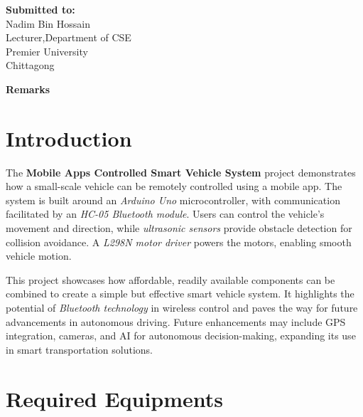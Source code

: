 \documentclass[12pt,a4paper]{report}
\begin{document}
\begin{titlepage}
    \begin{minipage}[t]{0.5\textwidth}
        \textbf{Submitted to:}
        \\Nadim Bin Hossain
        \\Lecturer,Department of CSE
        \\ Premier University
        \\ Chittagong
    \end{minipage}%
    \begin{minipage}[t]{0.6\textwidth}
        \raggedleft
        \textbf{Remarks}\\
        \vspace{0.5cm} 
    \end{minipage}

    \date{\today}
    \vfill
\end{titlepage}
\tableofcontents
\newpage


\chapter*{Introduction}

The \textbf{Mobile Apps Controlled Smart Vehicle System} project demonstrates how a small-scale vehicle can be remotely controlled using a mobile app. The system is built around an \textit{Arduino Uno} microcontroller, with communication facilitated by an \textit{HC-05 Bluetooth module}. Users can control the vehicle’s movement and direction, while \textit{ultrasonic sensors} provide obstacle detection for collision avoidance. A \textit{L298N motor driver} powers the motors, enabling smooth vehicle motion.

This project showcases how affordable, readily available components can be combined to create a simple but effective smart vehicle system. It highlights the potential of \textit{Bluetooth technology} in wireless control and paves the way for future advancements in autonomous driving. Future enhancements may include GPS integration, cameras, and AI for autonomous decision-making, expanding its use in smart transportation solutions.

\chapter*{Required Equipments}
\end{document}
